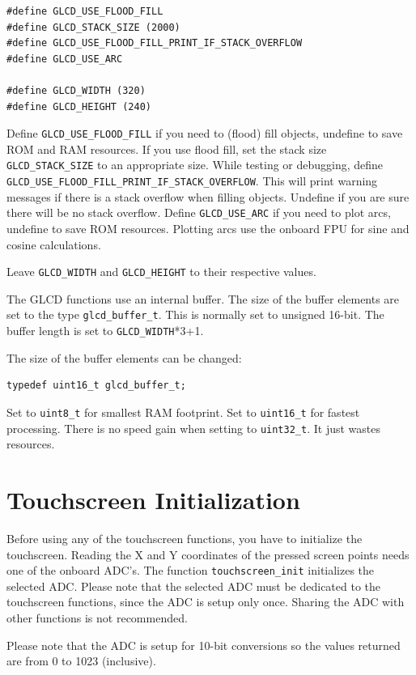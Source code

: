 \documentclass[12pt]{article}
\begin{document}
\begin{lstlisting}
#define GLCD_USE_FLOOD_FILL
#define GLCD_STACK_SIZE (2000)
#define GLCD_USE_FLOOD_FILL_PRINT_IF_STACK_OVERFLOW
#define GLCD_USE_ARC

#define GLCD_WIDTH (320)
#define GLCD_HEIGHT (240)
\end{lstlisting}

Define \lstinline|GLCD_USE_FLOOD_FILL| if you need to (flood) fill objects, undefine to save ROM  and RAM resources. If you use flood fill, set the stack size \lstinline|GLCD_STACK_SIZE| to an appropriate size. While testing or debugging, define \lstinline|GLCD_USE_FLOOD_FILL_PRINT_IF_STACK_OVERFLOW|. This will print warning messages if there is a stack overflow when filling objects. Undefine if you are sure there will be no stack overflow. Define \lstinline|GLCD_USE_ARC| if you need to plot arcs, undefine to save ROM resources. Plotting arcs use the onboard FPU for sine and cosine calculations.

Leave \lstinline|GLCD_WIDTH| and \lstinline|GLCD_HEIGHT| to their respective values.

The GLCD functions use an internal buffer. The size of the buffer elements are set to the type \lstinline|glcd_buffer_t|. This is normally set to unsigned 16-bit. The buffer length is set to \lstinline|GLCD_WIDTH|*3+1.

The size of the buffer elements can be changed:

\begin{lstlisting}
typedef uint16_t glcd_buffer_t;
\end{lstlisting}

Set to \lstinline|uint8_t| for smallest RAM footprint. Set to \lstinline|uint16_t| for fastest processing. There is no speed gain when setting to \lstinline|uint32_t|. It just wastes resources.

\section{Touchscreen Initialization}
Before using any of the touchscreen functions, you have to initialize the touchscreen. Reading the X and Y coordinates of the pressed screen points needs one of the onboard ADC's. The function \lstinline|touchscreen_init| initializes the selected ADC. Please note that the selected ADC must be dedicated to the touchscreen functions, since the ADC is setup only once. Sharing the ADC with other functions is not recommended.

Please note that the ADC is setup for 10-bit conversions so the values returned are from 0 to 1023 (inclusive).
\end{document}
